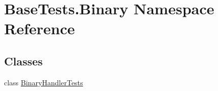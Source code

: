 \hypertarget{namespace_base_tests_1_1_binary}{}\section{Base\+Tests.\+Binary Namespace Reference}
\label{namespace_base_tests_1_1_binary}
\subsection*{Classes}
\begin{DoxyCompactItemize}
\item 
class \mbox{\hyperlink{class_base_tests_1_1_binary_1_1_binary_handler_tests}{Binary\+Handler\+Tests}}
\end{DoxyCompactItemize}
